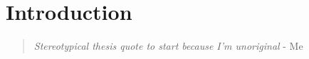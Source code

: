\setcounter{figure}{0}
\setcounter{table}{0} %
\section{Introduction}

\begin{quote}\textit{
    Stereotypical thesis quote to start because I'm unoriginal} - Me 
\end{quote}

\lipsum[1-5]